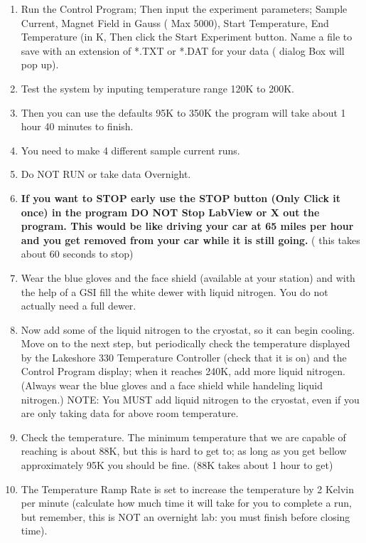 \documentclass{../lab}
\begin{document}
\begin{enumerate}
    \item Run the Control Program; Then input the experiment parameters; Sample Current, Magnet Field in Gauss ( Max 5000), Start Temperature, End Temperature (in K, Then click the Start Experiment button. Name a file to save with an extension of *.TXT or *.DAT for your data ( dialog Box will pop up).

    \item Test the system by inputing temperature range 120K to 200K.

    \item Then you can use the defaults 95K to 350K the program will take about 1 hour 40 minutes to finish.

    \item You need to make 4 different sample current runs.

    \item Do NOT RUN or take data Overnight.

    \item \textbf{If you want to STOP early use the STOP button (Only Click it once) in the program DO NOT Stop LabView or X out the program. This would be like driving your car at 65 miles per hour and you get removed from your car while it is still going.} ( this takes about 60 seconds to stop)

    \item Wear the blue gloves and the face shield (available at your station) and with the help of a GSI fill the white dewer with liquid nitrogen. You do not actually need a full dewer.

    \item Now add some of the liquid nitrogen to the cryostat, so it can begin cooling. Move on to the next step, but periodically check the temperature displayed by the Lakeshore 330 Temperature Controller (check that it is on) and the Control Program display; when it reaches 240K, add more liquid nitrogen.(Always wear the blue gloves and a face shield while handeling liquid nitrogen.) NOTE: You MUST add liquid nitrogen to the cryostat, even if you are only taking data for above room temperature.

    \item Check the temperature. The minimum temperature that we are capable of reaching is about 88K, but this is hard to get to; as long as you get bellow approximately 95K you should be fine. (88K takes about 1 hour to get)

    \item The Temperature Ramp Rate is set to increase the temperature by 2 Kelvin per minute (calculate how much time it will take for you to complete a run,  but remember, this is NOT an overnight lab: you must finish before closing time).


\end{enumerate}
\end{document}
